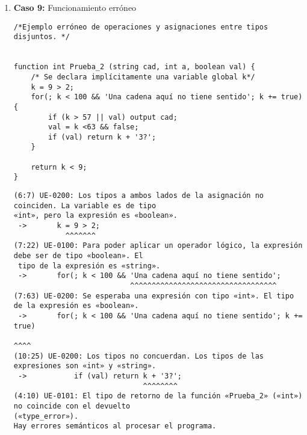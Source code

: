 \begin{enumerate}
    \begin{tcolorbox}[title={Errores detectados}, colback=white]
        \begin{lstlisting}
(11:11) UE-0200: Los tipos a ambos lados de la asignación no coinciden. La variable es de tipo
«int», pero la expresión es «boolean».
 ->   resultado = a > b && a < 9;
                ^^^^^^^^^^^^^^^^
(15:5) SE-0400: Elemento de tipo «identificador» inesperado. Se esperaba un tipo de variable
válido («int», «boolean» o «string»).
 ->   var bulean resultado;
          ^^^^^^
ERROR CRÍTICO: Error irrecuperable al procesar la entrada.
        \end{lstlisting}
    \end{tcolorbox}





    \item \textbf{Caso 9:} Funcionamiento erróneo
    \begin{tcolorbox}[title={Código fuente}, colback=white]
        \begin{lstlisting}
/*Ejemplo erróneo de operaciones y asignaciones entre tipos disjuntos. */


function int Prueba_2 (string cad, int a, boolean val) {
    /* Se declara implícitamente una variable global k*/
    k = 9 > 2;
    for(; k < 100 && 'Una cadena aquí no tiene sentido'; k += true) {
        if (k > 57 || val) output cad;
        val = k <63 && false;
        if (val) return k + '3?';
    }

    return k < 9;
}
        \end{lstlisting}
    \end{tcolorbox}

    \begin{tcolorbox}[title={Errores detectados}, colback=white]
        \begin{lstlisting}
(6:7) UE-0200: Los tipos a ambos lados de la asignación no coinciden. La variable es de tipo
«int», pero la expresión es «boolean».
 ->       k = 9 > 2;
            ^^^^^^^
(7:22) UE-0100: Para poder aplicar un operador lógico, la expresión debe ser de tipo «boolean». El
 tipo de la expresión es «string».
 ->       for(; k < 100 && 'Una cadena aquí no tiene sentido';
                           ^^^^^^^^^^^^^^^^^^^^^^^^^^^^^^^^^^
(7:63) UE-0200: Se esperaba una expresión con tipo «int». El tipo de la expresión es «boolean».
 ->       for(; k < 100 && 'Una cadena aquí no tiene sentido'; k += true)
                                                                    ^^^^
(10:25) UE-0200: Los tipos no concuerdan. Los tipos de las expresiones son «int» y «string».
 ->           if (val) return k + '3?';
                              ^^^^^^^^
(4:10) UE-0101: El tipo de retorno de la función «Prueba_2» («int») no coincide con el devuelto
(«type_error»).
Hay errores semánticos al procesar el programa.
        \end{lstlisting}
    \end{tcolorbox}






\end{enumerate}
